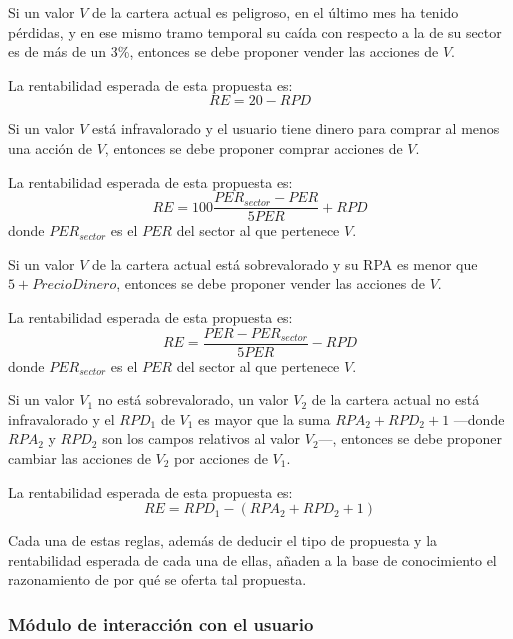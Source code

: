 \documentclass[a4paper, 11pt, titlepage]{article}
\begin{document}
    \begin{regla}
        Si un valor $V$ de la cartera actual es peligroso, en el último mes ha tenido pérdidas, y en ese mismo tramo temporal su caída con respecto a la de su sector es de más de un 3\%, entonces se debe proponer vender las acciones de $V$.

        La rentabilidad esperada de esta propuesta es:
        \[
        RE = 20 - RPD
        \]
    \end{regla}

    \begin{regla}
        Si un valor $V$ está infravalorado y el usuario tiene dinero para comprar al menos una acción de $V$, entonces se debe proponer comprar acciones de $V$.

        La rentabilidad esperada de esta propuesta es:
        \[
        RE = 100 \frac{PER_{sector} - PER}{5 PER} + RPD
        \]
        donde $PER_{sector}$ es el $PER$ del sector al que pertenece $V$.
    \end{regla}

    \begin{regla}
        Si un valor $V$ de la cartera actual está sobrevalorado y su RPA es menor que $5 + PrecioDinero$, entonces se debe proponer vender las acciones de $V$.

        La rentabilidad esperada de esta propuesta es:
        \[
        RE = \frac{PER - PER_{sector}}{5 PER} - RPD
        \]
        donde $PER_{sector}$ es el $PER$ del sector al que pertenece $V$.
    \end{regla}

    \begin{regla}
        Si un valor $V_1$ no está sobrevalorado, un valor $V_2$ de la cartera actual no está infravalorado y el $RPD_1$ de $V_1$ es mayor que la suma $RPA_2 + RPD_2 + 1$ ---donde $RPA_2$ y $RPD_2$ son los campos relativos al valor $V_2$---, entonces se debe proponer cambiar las acciones de $V_2$ por acciones de $V_1$.

        La rentabilidad esperada de esta propuesta es:
        \[
        RE = RPD_1 - (RPA_2 + RPD_2 + 1)
        \]
    \end{regla}

    Cada una de estas reglas, además de deducir el tipo de propuesta y la rentabilidad esperada de cada una de ellas, añaden a la base de conocimiento el razonamiento de por qué se oferta tal propuesta.

    \subsubsection{Módulo de interacción con el usuario}
\end{document}
